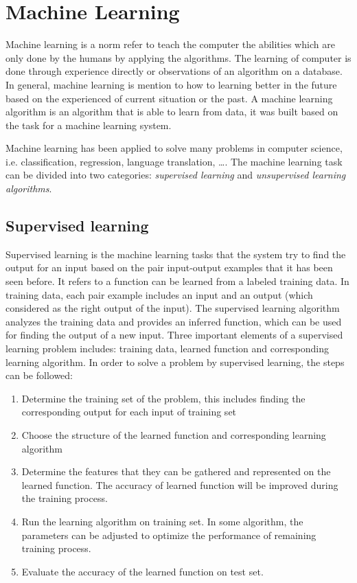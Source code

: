 \chapter{Machine Learning}
Machine learning is a norm refer to teach the computer the abilities which are only done by the humans by applying the algorithms. The learning of computer is done through experience directly or observations of an algorithm on a database. In general, machine learning is mention to how to learning better in the future based on the experienced of current situation or the past. A machine learning algorithm is an algorithm that is able to learn from data, it was built based on the task for a machine learning system. 

Machine learning has been applied to solve many problems in computer science, i.e. classification, regression, language translation, \ldots. The machine learning task can be divided into two categories: \textit{supervised learning} and \textit{unsupervised learning algorithms}. 

\section{Supervised learning}
Supervised learning is the machine learning tasks that the system try to find the output for an input based on the pair input-output examples that it has been seen before. It refers to a function can be learned from a labeled training data. In training data, each pair example includes an input and an output (which considered as the right output of the input). The supervised learning algorithm analyzes the training data and provides an inferred function, which can be used for finding the output of a new input. Three important elements of a supervised learning problem includes: training data, learned function and corresponding learning algorithm. In order to solve a problem by supervised learning, the steps can be followed:
\begin{enumerate}
	\item Determine the training set of the problem, this includes finding the corresponding output for each input of training set
	\item Choose the structure of the learned function and corresponding learning algorithm
	\item Determine the features that they can be gathered and represented on the learned function. The accuracy of learned function will be improved during the training process.
	\item Run the learning algorithm on training set. In some algorithm, the parameters can be adjusted to optimize the performance of remaining training process.
	\item Evaluate the accuracy of the learned function on test set.
\end{enumerate}


